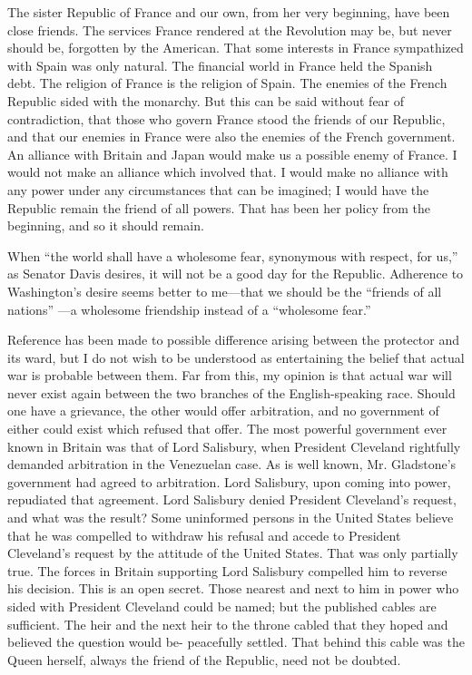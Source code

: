 \documentclass[11pt,openany]{book}
\begin{document}
The sister Republic of France and our own, from her very beginning, have been close friends. The services France rendered at the Revolution may be, but never should be, forgotten by the American. That some interests in France sympathized with Spain was only natural. The financial world in France held the Spanish debt. The religion of France is the religion of Spain. The enemies of the French Republic sided with the monarchy. But this can be said without fear of contradiction, that those who govern France stood the friends of our Republic, and that our enemies in France were also the enemies of the French government. An alliance with Britain and Japan would make us a possible enemy of France. I would not make an alliance which involved that. I would make no alliance with any power under any circumstances that can be imagined; I would have the Republic remain the friend of all powers. That has been her policy from the beginning, and so it should remain.

When ``the world shall have a wholesome fear, synonymous with respect, for us,'' as Senator Davis desires, it will not be a good day for the Republic. Adherence to Washington's desire seems better to me---that we should be the ``friends of all nations'' ---a wholesome friendship instead of a ``wholesome fear.''

Reference has been made to possible difference arising between the protector and its ward, but I do not wish to be understood as entertaining the belief that actual war is probable between them. Far from this, my opinion is that actual war will never exist again between the two branches of the English-speaking race. Should one have a grievance, the other would offer arbitration, and no government of either could exist which refused that offer. The most powerful government ever known in Britain was that of Lord Salisbury, when President Cleveland rightfully demanded arbitration in the Venezuelan case. As is well known, Mr. Gladstone's government had agreed to arbitration. Lord Salisbury, upon coming into power, repudiated that agreement. Lord Salisbury denied President Cleveland's request, and what was the result? Some uninformed persons in the United States believe that he was compelled to withdraw his refusal and accede to President Cleveland's request by the attitude of the United States. That was only partially true. The forces in Britain supporting Lord Salisbury compelled him to reverse his decision. This is an open secret. Those nearest and next to him in power who sided with President Cleveland could be named; but the published cables are sufficient. The heir and the next heir to the throne cabled that they hoped and believed the question would be- peacefully settled. That behind this cable was the Queen herself, always the friend of the Republic, need not be doubted.
\end{document}
